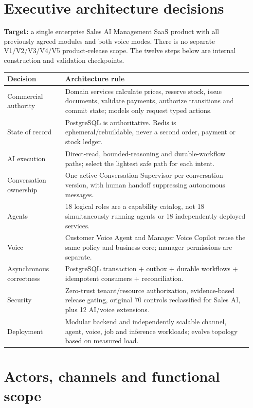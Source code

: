 \documentclass[10.5pt,a4paper,oneside]{article}
\begin{document}
\section{Executive architecture decisions}
\begin{keybox}
\textbf{Target:} a single enterprise Sales AI Management SaaS product with all previously agreed modules and both voice modes. There is no separate V1/V2/V3/V4/V5 product-release scope. The twelve steps below are internal construction and validation checkpoints.
\end{keybox}
\begin{tabularx}{\textwidth}{@{}L{40mm}Y@{}}
\toprule{}\textbf{Decision} & \textbf{Architecture rule}\\\midrule
Commercial authority & Domain services calculate prices, reserve stock, issue documents, validate payments, authorize transitions and commit state; models only request typed actions.\\
State of record & PostgreSQL is authoritative. Redis is ephemeral/rebuildable, never a second order, payment or stock ledger.\\
AI execution & Direct-read, bounded-reasoning and durable-workflow paths; select the lightest safe path for each intent.\\
Conversation ownership & One active Conversation Supervisor per conversation version, with human handoff suppressing autonomous messages.\\
Agents & 18 logical roles are a capability catalog, not 18 simultaneously running agents or 18 independently deployed services.\\
Voice & Customer Voice Agent and Manager Voice Copilot reuse the same policy and business core; manager permissions are separate.\\
Asynchronous correctness & PostgreSQL transaction + outbox + durable workflows + idempotent consumers + reconciliation.\\
Security & Zero-trust tenant/resource authorization, evidence-based release gating, original 70 controls reclassified for Sales AI, plus 12 AI/voice extensions.\\
Deployment & Modular backend and independently scalable channel, agent, voice, job and inference workloads; evolve topology based on measured load.\\
\bottomrule
\end{tabularx}

\section{Actors, channels and functional scope}
\end{document}
